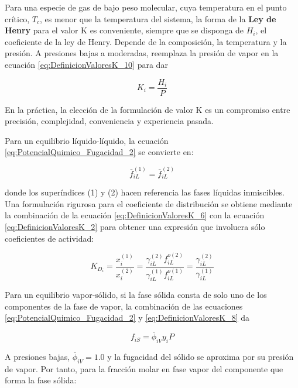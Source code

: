 \documentclass[11pt]{book}
\begin{document}
Para una especie de gas de bajo peso molecular, cuya temperatura en el punto crítico, $T_c$, es menor que la temperatura del sistema, la forma de la \textbf{Ley de Henry} para el valor K es conveniente, siempre que se disponga de $H_i$, el coeficiente de la ley de Henry. Depende de la composición, la temperatura y la presión. A presiones bajas a moderadas, reemplaza la presión de vapor en la ecuación \ref{eq:DefinicionValoresK_10} para dar

\begin{equation}
    \label{eq:DefinicionValoresK_14}
    K_i = \frac{H_i}{P}
\end{equation}

En la práctica, la elección de la formulación de valor K es un compromiso entre precisión, complejidad, conveniencia y experiencia pasada.

Para un equilibrio líquido-líquido, la ecuación \ref{eq:PotencialQuimico_Fugacidad_2} se convierte en:

\begin{equation}
    \label{eq_Equilibrio_LiqLiq_1}
    \overline{f}_{iL}^{(1)} = \overline{f}_{iL}^{(2)}
\end{equation}

donde los superíndices (1) y (2) hacen referencia las fases líquidas inmiscibles. Una formulación rigurosa para el coeficiente de distribución se obtiene mediante la combinación de la ecuación \ref{eq:DefinicionValoresK_6} con la ecuación \ref{eq:DefinicionValoresK_2} para obtener una expresión que involucra sólo coeficientes de actividad:

\begin{equation}
    \label{eq_Equilibrio_LiqLiq_2}
    K_{D_i} = \frac{x_i^{(1)}}{x_i^{(2)}} = \frac{\gamma_{iL}^{(2)} f_{iL}^{o (2)}}{\gamma_{iL}^{(1)} f_{iL}^{o (1)}} = \frac{\gamma_{iL}^{(2)}}{\gamma_{iL}^{(1)}}
\end{equation}

Para un equilibrio vapor-sólido, si la fase sólida consta de solo uno de los componentes de la fase de vapor, la combinación de las ecuaciones \ref{eq:PotencialQuimico_Fugacidad_2} y \ref{eq:DefinicionValoresK_8} da

\begin{equation}
    \label{eq:Equilibrio_SolGas_1}
    f_{iS} = \overline{\phi}_{iV} y_i P 
\end{equation}

A presiones bajas, $\overline{\phi}_{iV} = 1.0$ y la fugacidad del sólido se aproxima por su presión de vapor. Por tanto, para la fracción molar en fase vapor del componente que forma la fase sólida:
\end{document}
